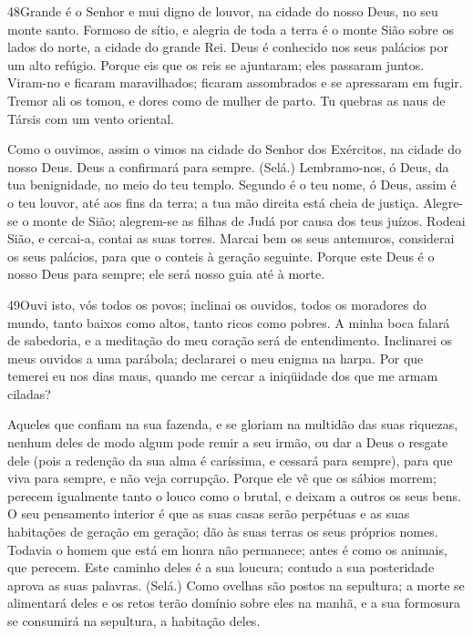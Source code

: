 \bigskip

\lettrine{48}{}Grande é o Senhor e mui digno de louvor, na
cidade do nosso Deus, no seu monte santo. Formoso de sítio, e
alegria de toda a terra é o monte Sião sobre os lados do norte, a
cidade do grande Rei. Deus é conhecido nos seus palácios por um
alto refúgio. Porque eis que os reis se ajuntaram; eles passaram
juntos. Viram-no e ficaram maravilhados; ficaram assombrados e
se apressaram em fugir. Tremor ali os tomou, e dores como de
mulher de parto. Tu quebras as naus de Társis com um vento
oriental.

Como o ouvimos, assim o vimos na cidade do Senhor dos Exércitos,
na cidade do nosso Deus. Deus a confirmará para sempre. (Selá.)
Lembramo-nos, ó Deus, da tua benignidade, no meio do teu templo.
Segundo é o teu nome, ó Deus, assim é o teu louvor, até aos
fins da terra; a tua mão direita está cheia de justiça.
Alegre-se o monte de Sião; alegrem-se as filhas de Judá por
causa dos teus juízos. Rodeai Sião, e cercai-a, contai as
suas torres. Marcai bem os seus antemuros, considerai os seus
palácios, para que o conteis à geração seguinte. Porque este
Deus é o nosso Deus para sempre; ele será nosso guia até à morte.

\bigskip

\lettrine{49}{}Ouvi isto, vós todos os povos; inclinai os
ouvidos, todos os moradores do mundo, tanto baixos como altos,
tanto ricos como pobres. A minha boca falará de sabedoria, e a
meditação do meu coração será de entendimento. Inclinarei os
meus ouvidos a uma parábola; declararei o meu enigma na harpa.
Por que temerei eu nos dias maus, quando me cercar a iniqüidade
dos que me armam ciladas?

Aqueles que confiam na sua fazenda, e se gloriam na multidão das
suas riquezas, nenhum deles de modo algum pode remir a seu
irmão, ou dar a Deus o resgate dele (pois a redenção da sua alma
é caríssima, e cessará para sempre), para que viva para sempre,
e não veja corrupção. Porque ele vê que os sábios morrem;
perecem igualmente tanto o louco como o brutal, e deixam a outros os
seus bens. O seu pensamento interior é que as suas casas
serão perpétuas e as suas habitações de geração em geração; dão às
suas terras os seus próprios nomes. Todavia o homem que está
em honra não permanece; antes é como os animais, que perecem.
Este caminho deles é a sua loucura; contudo a sua posteridade
aprova as suas palavras. (Selá.) Como ovelhas são postos na
sepultura; a morte se alimentará deles e os retos terão domínio
sobre eles na manhã, e a sua formosura se consumirá na sepultura, a
habitação deles.

